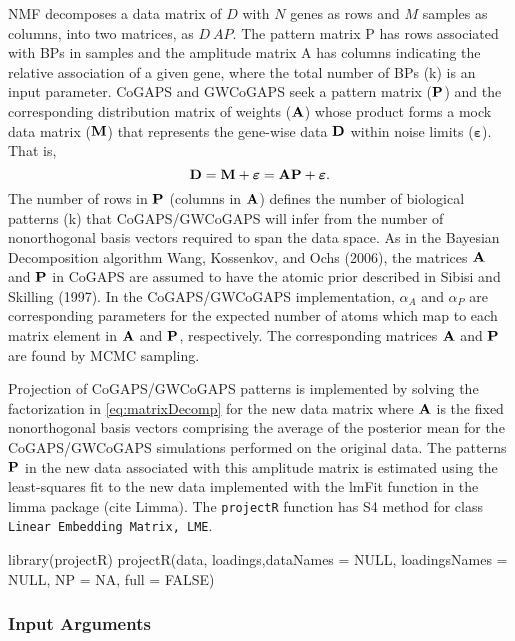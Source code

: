 \documentclass[]{article}
\renewenvironment{verbatim}{\color{codecolor}\begin{myshaded}\begin{oldverbatim}}{\end{oldverbatim}\end{myshaded}}
\begin{document}
NMF decomposes a data matrix of \(D\) with \(N\) genes as rows and \(M\) samples as columns, into two matrices, as \(D ~ AP\). The pattern matrix P has rows associated with BPs in samples and the amplitude matrix A has columns indicating the relative association of a given gene, where the total number of BPs (k) is an input parameter. CoGAPS and GWCoGAPS seek a pattern matrix (\({\bf{P}}\)) and the corresponding distribution matrix of weights (\({\bf{A}}\)) whose product forms a mock data matrix (\({\bf{M}}\)) that represents the gene-wise data \({\bf{D}}\) within noise limits (\(\boldsymbol{\varepsilon}\)). That is,
\begin{equation}
{\bf{D}} = {\bf{M}} + \boldsymbol{\varepsilon} = {\bf{A}}{\bf{P}} + \boldsymbol{\varepsilon}.
\label{eq:matrixDecomp}
\end{equation}
The number of rows in \({\bf{P}}\) (columns in \({\bf{A}}\)) defines the number of biological patterns (k) that CoGAPS/GWCoGAPS will infer from the number of nonorthogonal basis vectors required to span the data space. As in the Bayesian Decomposition algorithm Wang, Kossenkov, and Ochs (2006), the matrices \({\bf{A}}\) and \({\bf{P}}\) in CoGAPS are assumed to have the atomic prior described in Sibisi and Skilling (1997). In the CoGAPS/GWCoGAPS implementation, \(\alpha_{A}\) and \(\alpha_{P}\) are corresponding parameters for the expected number of atoms which map to each matrix element in \({\bf{A}}\) and \({\bf{P}}\), respectively. The corresponding matrices \({\bf{A}}\) and \({\bf{P}}\) are found by MCMC sampling.

Projection of CoGAPS/GWCoGAPS patterns is implemented by solving the factorization in \ref{eq:matrixDecomp} for the new data matrix where \({\bf{A}}\) is the fixed nonorthogonal basis vectors comprising the average of the posterior mean for the CoGAPS/GWCoGAPS simulations performed on the original data. The patterns \({\bf{P}}\) in the new data associated with this amplitude matrix is estimated using the least-squares fit to the new data implemented with the lmFit function in the limma package (cite Limma). The \texttt{projectR} function has S4 method for class \texttt{Linear Embedding Matrix, LME}.

\begin{verbatim}
library(projectR)
projectR(data, loadings,dataNames = NULL, loadingsNames = NULL,
     NP = NA, full = FALSE)
\end{verbatim}

\hypertarget{input-arguments-1}{%
\subsubsection{Input Arguments}\label{input-arguments-1}}
\end{document}
